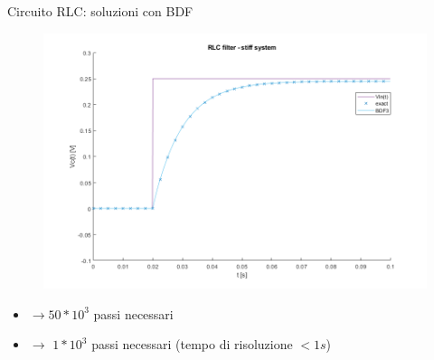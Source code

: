 \documentclass[aspectratio=169, 10pt, handout,usenames,dvipsnames]{beamer}
\begin{document}
 \begin{frame}{Circuito RLC: soluzioni con BDF}
    \begin{figure}
        \centering
        \includegraphics[width=.68\linewidth]{rlc_solution_comparison.png}
        \label{fig:rlc_bdf_solution}
    \end{figure}
    
    \begin{itemize}
        \item{ $\rightarrow 50*10^3$ passi necessari}
        \item{ $\rightarrow$ \space $1*10^3$ passi necessari (tempo di risoluzione $<1s$)}
    \end{itemize}
 \end{frame}
 
 

\end{document}
